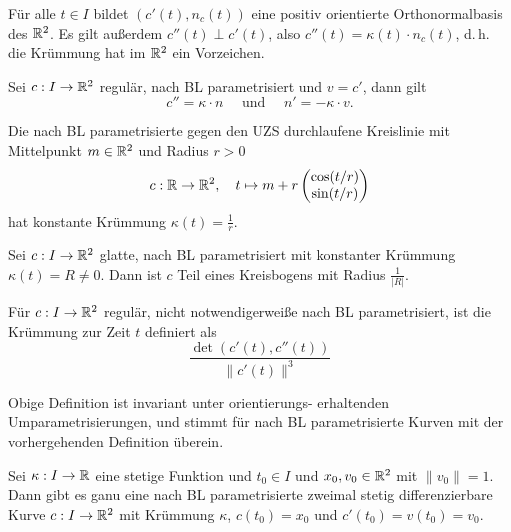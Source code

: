 \documentclass{cheat-sheet}
\begin{document}
\begin{bem}
  Für alle $t \in I$ bildet $(c'(t), n_c(t))$ eine positiv orientierte Orthonormalbasis des $\mathbb{R}^2$.
  Es gilt außerdem $c''(t) \perp c'(t)$, also $c''(t) = \kappa(t) \cdot n_c(t)$, d.\,h. die Krümmung hat im $\mathbb{R}^2$ ein Vorzeichen.
\end{bem}

\begin{satz}
  Sei $c : I \to \mathbb{R}^2$ regulär, nach BL parametrisiert und $v = c'$, dann gilt
  \[ c'' = \kappa \cdot n \quad \text{ und } \quad n' = -\kappa \cdot v. \]
\end{satz}


\begin{bsp}
  Die nach BL parametrisierte gegen den UZS durchlaufene Kreislinie mit Mittelpunkt $m \in \mathbb{R}^2$ und Radius $r > 0$
  \[ c : \mathbb{R} \to \mathbb{R}^2, \quad t \mapsto m + r \begin{pmatrix} \cos(t/r) \\ \sin(t/r) \end{pmatrix} \]
  hat konstante Krümmung $\kappa(t) = \tfrac{1}{r}$.
\end{bsp}

\begin{satz}
  Sei $c : I \to \mathbb{R}^2$ glatte, nach BL parametrisiert mit konstanter Krümmung $\kappa(t) = R \not= 0$. Dann ist $c$ Teil eines Kreisbogens mit Radius $\tfrac{1}{|R|}$.
\end{satz}

\begin{defn}
  Für $c : I \to \mathbb{R}^2$ regulär, nicht notwendigerweiße nach BL parametrisiert, ist die Krümmung zur Zeit $t$ definiert als
  \[ \frac{\det(c'(t), c''(t))}{ \| c'(t) \|^3 } \]
\end{defn}

\begin{bem}
  Obige Definition ist invariant unter orientierungs- erhaltenden Umparametrisierungen, und stimmt für nach BL parametrisierte Kurven mit der vorhergehenden Definition überein.
\end{bem}

\begin{satz}
  Sei $\kappa : I \to \mathbb{R}$ eine stetige Funktion und $t_0 \in I$ und $x_0, v_0 \in \mathbb{R}^2$ mit $\| v_0 \| = 1$. Dann gibt es ganu eine nach BL parametrisierte zweimal stetig differenzierbare Kurve $c : I \to \mathbb{R}^2$ mit Krümmung $\kappa$, $c(t_0) = x_0$ und $c'(t_0) = v(t_0) = v_0$.
\end{satz}
\end{document}
